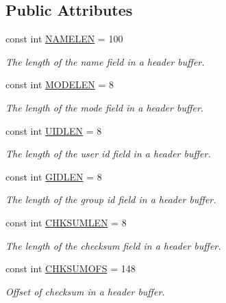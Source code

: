 \subsection*{Public Attributes}
\begin{DoxyCompactItemize}
\item 
const int \hyperlink{class_i_c_sharp_code_1_1_sharp_zip_lib_1_1_tar_1_1_tar_header_aacafd8f6daaf15fb27627a8d75fdf7d2}{N\+A\+M\+E\+L\+EN} = 100
\begin{DoxyCompactList}\small\item\em The length of the name field in a header buffer. \end{DoxyCompactList}\item 
const int \hyperlink{class_i_c_sharp_code_1_1_sharp_zip_lib_1_1_tar_1_1_tar_header_afd1ae03812bd830590b24d0732ec2cd0}{M\+O\+D\+E\+L\+EN} = 8
\begin{DoxyCompactList}\small\item\em The length of the mode field in a header buffer. \end{DoxyCompactList}\item 
const int \hyperlink{class_i_c_sharp_code_1_1_sharp_zip_lib_1_1_tar_1_1_tar_header_a33a46d3e1dbeb887fe8079cec5cdc35b}{U\+I\+D\+L\+EN} = 8
\begin{DoxyCompactList}\small\item\em The length of the user id field in a header buffer. \end{DoxyCompactList}\item 
const int \hyperlink{class_i_c_sharp_code_1_1_sharp_zip_lib_1_1_tar_1_1_tar_header_a1330df24cee6fb4ff1a7f79a25c8d634}{G\+I\+D\+L\+EN} = 8
\begin{DoxyCompactList}\small\item\em The length of the group id field in a header buffer. \end{DoxyCompactList}\item 
const int \hyperlink{class_i_c_sharp_code_1_1_sharp_zip_lib_1_1_tar_1_1_tar_header_a19f6831ed1084c692a09415832b62400}{C\+H\+K\+S\+U\+M\+L\+EN} = 8
\begin{DoxyCompactList}\small\item\em The length of the checksum field in a header buffer. \end{DoxyCompactList}\item 
const int \hyperlink{class_i_c_sharp_code_1_1_sharp_zip_lib_1_1_tar_1_1_tar_header_a47464443a8a29ea5b57a021a5baadd68}{C\+H\+K\+S\+U\+M\+O\+FS} = 148
\begin{DoxyCompactList}\small\item\em Offset of checksum in a header buffer. \end{DoxyCompactList}\item 

\end{DoxyCompactItemize}
